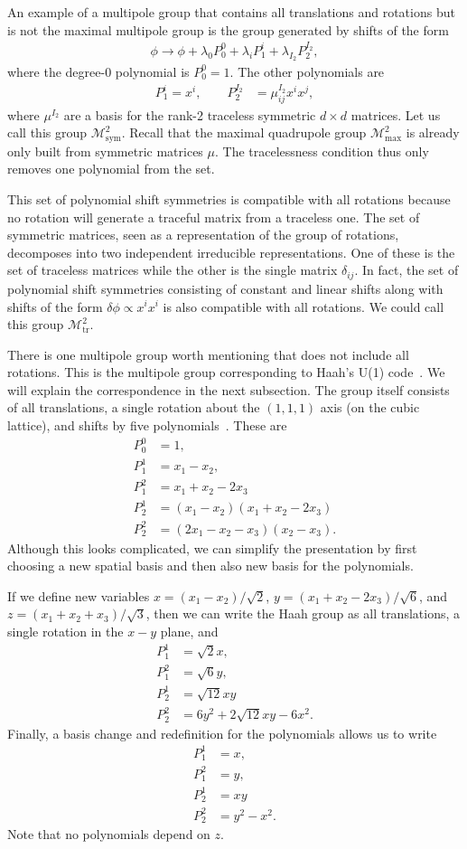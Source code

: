 \documentclass[pra,aps,twocolumn, amsfonts,amsmath,amssymb,nofootinbib,superscriptaddress]{revtex4}
\newcommand{\nn}{\nonumber\\}
\newcommand{\goesto}{\rightarrow}
\begin{document}
An example of a multipole group that contains all translations and rotations but is not the maximal multipole group is the group generated by shifts of the form
\begin{align}
\phi \goesto \phi + \lambda_0 P_0^0 + \lambda_{i} P^{i}_1 + \lambda_{I_2} P^{I_2}_2,
\end{align}
where the degree-0 polynomial is $P_0^0=1$. The other polynomials are
\begin{align}
P_1^{i} = x^i,\quad \quad P_2^{I_2} &= \mu^{I_2}_{ij} x^i x^j,
\end{align}
where $\mu^{I_2}$ are a basis for the rank-2 traceless symmetric $d\times d$ matrices. Let us call this group $\mathcal{M}^2_{\text{sym}}$. Recall that the maximal quadrupole group $\mathcal{M}^2_{\text{max}}$ is already only built from symmetric matrices $\mu$. The tracelessness condition thus only removes one polynomial from the set. 

This set of polynomial shift symmetries is compatible with all rotations because no rotation will generate a traceful matrix from a traceless one. The set of symmetric matrices, seen as a representation of the group of rotations, decomposes into two independent irreducible representations. One of these is the set of traceless matrices while the other is the single matrix $\delta_{ij}$. In fact, the set of polynomial shift symmetries consisting of constant and linear shifts along with shifts of the form $\delta \phi \propto x^ix^i$ is also compatible with all rotations. We could call this group $\mathcal{M}^2_\text{tr}$.

There is one multipole group worth mentioning that does not include all rotations. This is the multipole group corresponding to Haah's U(1) code~\cite{Haah2017, BB, Gromov2019}. We will explain the correspondence in the next subsection. The group itself consists of all translations, a single rotation about the $(1,1,1)$ axis (on the cubic lattice), and shifts by five polynomials~\cite{Gromov2019}. These are
\begin{align}
P_0^0 &= 1, \nn
P_1^1 &= x_1 - x_2,\nn
P_1^2 &= x_1 + x_2 - 2x_3\nn
P_2^1 &= (x_1 - x_2) (x_1 + x_2 - 2x_3)\nn
P_2^2 &= (2x_1 - x_2 - x_3) (x_2 - x_3).
\end{align}
Although this looks complicated, we can simplify the presentation by first choosing a new spatial basis and then also new basis for the polynomials.

If we define new variables $x = (x_1 - x_2)/\sqrt{2}$, $y = (x_1 + x_2 - 2x_3)/\sqrt{6}$, and $z = (x_1 + x_2 + x_3)/\sqrt{3}$, then we can write the Haah group as all translations, a single rotation in the $x-y$ plane, and
\begin{align}
P_1^1 &= \sqrt{2} x , \nn
P_1^2 &= \sqrt{6} y, \nn
P_2^1 &= \sqrt{12} xy\nn
P_2^2 &= 6y^2 +2\sqrt{12} xy - 6x^2.
\end{align}
Finally, a basis change and redefinition for the polynomials allows us to write
\begin{align}
P_1^1 &= x , \nn
P_1^2 &= y, \nn
P_2^1 &= xy\nn
P_2^2 &= y^2 - x^2.
\end{align}
Note that no polynomials depend on $z$.
\end{document}
